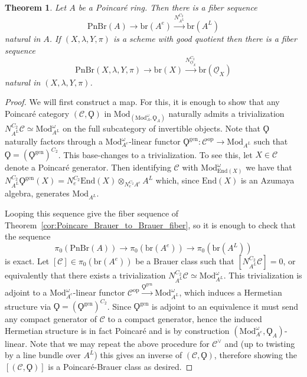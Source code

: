\documentclass{article}
\newcommand{\op}{\mathrm{op}} %
\newcommand{\pnbr}{\ensuremath{\mathrm{PnBr}}}
\newtheorem{theorem}[equation]{Theorem}
\theoremstyle{definition}
\begin{document}
    \begin{theorem}
        Let $A$ be a Poincar{\'e} ring. Then there is a fiber sequence \[\pnbr(A)\to \mathrm{br}(A^e)\xrightarrow{N^{C_2}_{A^L}} \mathrm{br}(A^L)\] natural in $A$. If $(X,\lambda, Y,\pi)$ is a scheme with good quotient then there is a fiber sequence \[\pnbr(X,\lambda, Y,\pi)\to \mathrm{br}(X)\xrightarrow{N^{C_2}_{\underline{O}_X}} \mathrm{br}(\underline{\mathcal{O}}_X)\] natural in $(X,\lambda, Y ,\pi)$. 
    \end{theorem}
    \begin{proof}
        We will first construct a map. For this, it is enough to show that any Poincar{\'e} category $(\mathcal{C},\Qoppa)$ in $\mathrm{Mod}_{(\mathrm{Mod}_{A}^\omega, \Qoppa_A)}$ naturally admits a trivialization $N^{C_2}_{A^L}\mathcal{C}\simeq \mathrm{Mod}_{A^L}^\omega$ on the full subcategory of invertible objects. Note that $\Qoppa$ naturally factors through a $\mathrm{Mod}_{A^e}^\omega$-linear functor $\Qoppa^{\text{gen}}:\mathcal{C}^\op \to \mathrm{Mod}_{A^L}$ such that $\Qoppa = (\Qoppa^{\text{gen}})^{C_2}$. This base-changes to a trivialization. To see this, let $X\in \mathcal{C}$ denote a Poincar{\'e} generator. Then identifying $\mathcal{C}$ with $\mathrm{Mod}_{\mathrm{End}(X)}^\omega$ we have that $N^{C_2}_{A^L}\Qoppa^{\text{gen}}(X)=N^{C_2}_{e}\mathrm{End}(X)\otimes_{N_e^{C_2}A^e}A^L$ which, since $\mathrm{End}(X)$ is an Azumaya algebra, generates $\mathrm{Mod}_{A^L}$. 
        
        Looping this sequence give the fiber sequence of Theorem~\ref{cor:Poincare_Brauer_to_Brauer_fiber}, so it is enough to check that the sequence \[\pi_0(\pnbr(A))\to \pi_0(\mathrm{br}(A^e))\to \pi_0(\mathrm{br}(A^L))\] is exact. Let $[\mathcal{C}]\in \pi_0(\mathrm{br}(A^e))$ be a Brauer class such that $[N^{C_2}_{A^L}\mathcal{C}]=0$, or equivalently that there exists a trivialization $N^{C_2}_{A^L}\mathcal{C}\simeq \mathrm{Mod}_{A^L}^\omega$. This trivialization is adjoint to a $\mathrm{Mod}_{A^e}^\omega$-linear functor $\mathcal{C}^{\op}\xrightarrow{\Qoppa^{\text{gen}}}\mathrm{Mod}_{A^L}^\omega$, which induces a Hermetian structure via $\Qoppa=(\Qoppa^{\text{gen}})^{C_2}$. Since $\Qoppa^{\text{gen}}$ is adjoint to an equivalence it must send any compact generator of $\mathcal{C}$ to a compact generator, hence the induced Hermetian structure is in fact Poincar{\'e} and is by construction $(\mathrm{Mod}_{A^e}^\omega, \Qoppa_A)$-linear. Note that we may repeat the above procedure for $\mathcal{C}^\vee$ and (up to twisting by a line bundle over $A^L$) this gives an inverse of $(\mathcal{C},\Qoppa)$, therefore showing the $[(\mathcal{C},\Qoppa)]$ is a Poincar{\'e}-Brauer class as desired.
    \end{proof}
\end{document}
